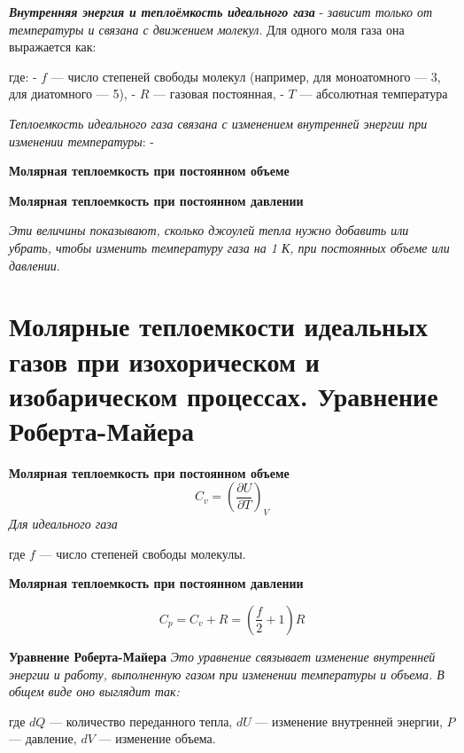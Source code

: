 \documentclass[14pt]{article}
\begin{document}
    \textbf{\textit{Внутренняя энергия и теплоёмкость идеального газа}}
    - \textit{зависит только от температуры и связана с движением молекул}.
     Для одного моля газа она выражается как: 
     \begin{center}
        \big[\[ U = \frac{f}{2} R T \]\big]
        где: - \( f \) — число степеней свободы молекул (например, для моноатомного — 3, для диатомного — 5), - \( R \) — газовая постоянная, - \( T \) — абсолютная температура
     \end{center}
    \textit{Теплоемкость идеального газа связана с изменением внутренней энергии при изменении температуры}: - 
    
    \textbf{Молярная теплоемкость при постоянном объеме}  
    \begin{center}
        \big[(\( C_v \))**: \[ C_v = \left(\frac{\partial U}{\partial T}\right)_V = \frac{f}{2} R \]\big]
    \end{center}
    
    \textbf{Молярная теплоемкость при постоянном давлении}
    \begin{center}
        \big[(\( C_p \))**: \[ C_p = C_v + R = \left(\frac{f}{2} + 1\right) R \]\big]

    \end{center}

    \textit{Эти величины показывают, сколько джоулей тепла нужно добавить или убрать, чтобы изменить температуру газа на 1 К, при постоянных объеме или давлении}.

    \section{Молярные теплоемкости идеальных газов при изохорическом и изобарическом процессах. Уравнение Роберта-Майера}
    \textbf{Молярная теплоемкость при постоянном объеме}
    \[C_v = \left( \frac{\partial U}{\partial T} \right)_V\]
    \textit{Для идеального газа}
    \begin{center}
        \big[\[C_v = \frac{f}{2} R\]\big]
        где \(f\) — число степеней свободы молекулы.
    \end{center}
    
\textbf{Молярная теплоемкость при постоянном давлении}

\[C_p = C_v + R = \left( \frac{f}{2} + 1 \right) R\]


\textbf{Уравнение Роберта-Майера}
\textit{Это уравнение связывает изменение внутренней энергии и работу, выполненную газом при изменении температуры и объема. В общем виде оно выглядит так:}
\begin{center}
    \big[\[dQ = dU + PdV\]\big]
    
где \(dQ\) — количество переданного тепла, \(dU\) — изменение внутренней энергии, \(P\) — давление, \(dV\) — изменение объема.
\end{center}
\end{document}
